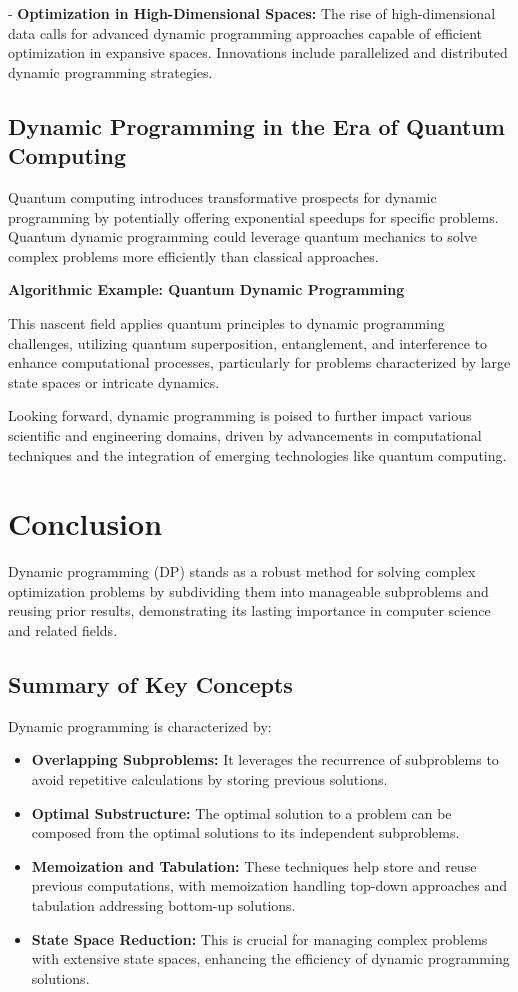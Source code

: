 \documentclass[12pt]{book} %
\begin{document}
- \textbf{Optimization in High-Dimensional Spaces:} The rise of high-dimensional data calls for advanced dynamic programming approaches capable of efficient optimization in expansive spaces. Innovations include parallelized and distributed dynamic programming strategies.

\subsection{Dynamic Programming in the Era of Quantum Computing}

Quantum computing introduces transformative prospects for dynamic programming by potentially offering exponential speedups for specific problems. Quantum dynamic programming could leverage quantum mechanics to solve complex problems more efficiently than classical approaches.

\textbf{Algorithmic Example: Quantum Dynamic Programming}

This nascent field applies quantum principles to dynamic programming challenges, utilizing quantum superposition, entanglement, and interference to enhance computational processes, particularly for problems characterized by large state spaces or intricate dynamics.

Looking forward, dynamic programming is poised to further impact various scientific and engineering domains, driven by advancements in computational techniques and the integration of emerging technologies like quantum computing.

\section{Conclusion}

Dynamic programming (DP) stands as a robust method for solving complex optimization problems by subdividing them into manageable subproblems and reusing prior results, demonstrating its lasting importance in computer science and related fields.

\subsection{Summary of Key Concepts}

Dynamic programming is characterized by:
\begin{itemize}
    \item \textbf{Overlapping Subproblems:} It leverages the recurrence of subproblems to avoid repetitive calculations by storing previous solutions.
    \item \textbf{Optimal Substructure:} The optimal solution to a problem can be composed from the optimal solutions to its independent subproblems.
    \item \textbf{Memoization and Tabulation:} These techniques help store and reuse previous computations, with memoization handling top-down approaches and tabulation addressing bottom-up solutions.
    \item \textbf{State Space Reduction:} This is crucial for managing complex problems with extensive state spaces, enhancing the efficiency of dynamic programming solutions.
\end{itemize}
\end{document}
